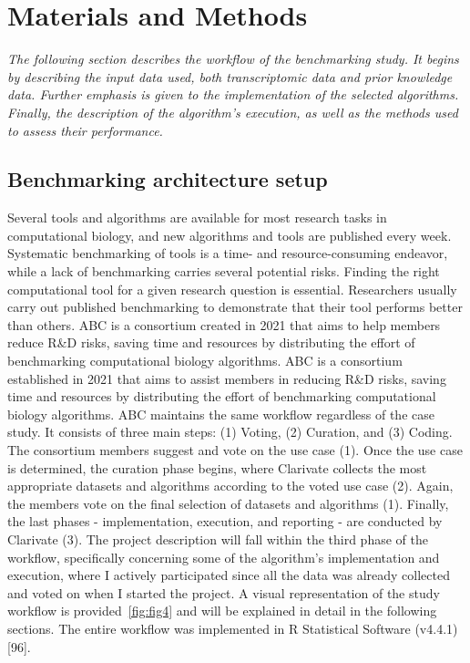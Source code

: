 
%


\chapter{Materials and Methods}
\label{cha:materials_and_methods}


\textit{The following section describes the workflow of the benchmarking study. It begins by describing the input data used, both transcriptomic data and prior knowledge data. Further emphasis is given to the implementation of the selected algorithms. Finally, the description of the algorithm's execution, as well as the methods used to assess their performance.}


\section{Benchmarking architecture setup} %
\label{sec:benchmarking_architecture_setup}
Several tools and algorithms are available for most research tasks in computational biology, and new algorithms and tools are published every week. Systematic benchmarking of tools is a time- and resource-consuming endeavor, while a lack of benchmarking carries several potential risks. Finding the right computational tool for a given research question is essential. Researchers usually carry out published benchmarking to demonstrate that their tool performs better than others. ABC is a consortium created in 2021 that aims to help members reduce R\&D risks, saving time and resources by distributing the effort of benchmarking computational biology algorithms. ABC is a consortium established in 2021 that aims to assist members in reducing R\&D risks, saving time and resources by distributing the effort of benchmarking computational biology algorithms. ABC maintains the same workflow regardless of the case study. It consists of three main steps: (1) Voting, (2) Curation, and (3) Coding. The consortium members suggest and vote on the use case (1). Once the use case is determined, the curation phase begins, where Clarivate collects the most appropriate datasets and algorithms according to the voted use case (2). Again, the members vote on the final selection of datasets and algorithms (1). Finally, the last phases - implementation, execution, and reporting - are conducted by Clarivate (3). 
The project description will fall within the third phase of the workflow, specifically concerning some of the algorithm's implementation and execution, where I actively participated since all the data was already collected and voted on when I started the project. A visual representation of the study workflow is provided~\ref{fig:fig4} and will be explained in detail in the following sections. The entire workflow was implemented in \gls{R} Statistical Software (v4.4.1) [96].

